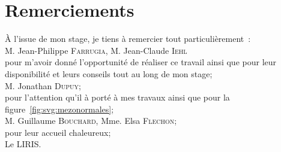 \documentclass[10pt,a4paper,twoside, twocolumn]{report}
\begin{document}
{}
\section*{Remerciements}



\begin{center}

  \vspace{5cm}
  À l'issue de mon stage, je tiens à remercier tout particulièrement~:\\
  \vspace{1cm}	
  M. Jean-Philippe \textsc{Farrugia}, M. Jean-Claude \textsc{Iehl}\\
  pour m'avoir donné l'opportunité de réaliser ce travail ainsi que pour leur disponibilité et leurs conseils tout au long de mon stage;\\
  \vspace{1cm}
  M. Jonathan \textsc{Dupuy};\\
  pour l'attention qu'il à porté à mes travaux ainsi que pour la figure~\ref{fig:svg:mezonormales};\\
	\vspace{1cm}
  M. Guillaume \textsc{Bouchard}, Mme. Elsa \textsc{Flechon};\\
  pour leur accueil chaleureux;\\
  \vspace{1cm}
  Le LIRIS.
\end{center}
\end{document}

